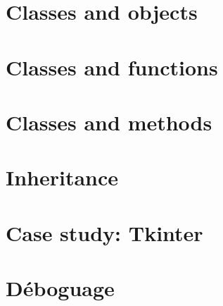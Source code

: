 \documentclass[french,10pt]{book}
\newcommand{\FR}{\color{blue} \normalsize}
\newcommand{\EN}{\color{red} \normalsize}
\newcommand{\UN}{\color{black}\normalsize}
\begin{document}
\chapter{Classes and objects}

\EN
\chapter{Classes and functions}
\label{time}

\EN
\chapter{Classes and methods}

\EN
\chapter{Inheritance}

\EN
\chapter{Case study: Tkinter}

\UN
\appendix
\FR
\chapter{Déboguage}

\UN
\printindex

\clearemptydoublepage
\end{document}
